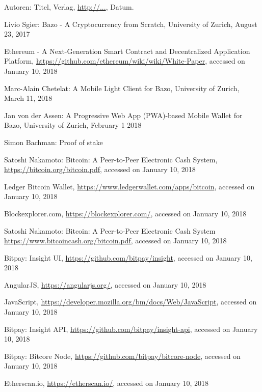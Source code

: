 \begin{thebibliography}{99}

 Autoren: Titel, Verlag, \url{http://...}, Datum.

 Livio Sgier: Bazo - A Cryptocurrency from Scratch, University of Zurich, August 23, 2017

 Ethereum - A Next-Generation Smart Contract and Decentralized Application Platform, \url{https://github.com/ethereum/wiki/wiki/White-Paper}, accessed on January 10, 2018

 Marc-Alain Chetelat: A Mobile Light Client for Bazo, University of Zurich, March 11, 2018

 Jan von der Assen: A Progressive Web App (PWA)-based Mobile Wallet for Bazo, University of Zurich, February 1 2018

 Simon Bachman: Proof of stake

 Satoshi Nakamoto: Bitcoin: A Peer-to-Peer Electronic Cash System, \url{https://bitcoin.org/bitcoin.pdf}, accessed on January 10, 2018

 Ledger Bitcoin Wallet, \url{https://www.ledgerwallet.com/apps/bitcoin}, accessed on January 10, 2018

 Blockexplorer.com, \url{https://blockexplorer.com/}, accessed on January 10, 2018

 Satoshi Nakamoto: Bitcoin: A Peer-to-Peer Electronic Cash System \url{https://www.bitcoincash.org/bitcoin.pdf}, accessed on January 10, 2018

 Bitpay: Insight UI, \url{https://github.com/bitpay/insight}, accessed on January 10, 2018

 AngularJS, \url{https://angularjs.org/}, accessed on January 10, 2018

 JavaScript, \url{https://developer.mozilla.org/bm/docs/Web/JavaScript}, accessed on January 10, 2018

 Bitpay: Insight API, \url{https://github.com/bitpay/insight-api}, accessed on January 10, 2018

 Bitpay: Bitcore Node, \url{https://github.com/bitpay/bitcore-node}, accessed on January 10, 2018

 Etherscan.io, \url{https://etherscan.io/}, accessed on January 10, 2018


\end{thebibliography}
